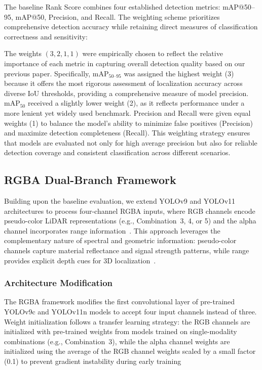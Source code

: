 \documentclass[runningheads]{llncs}
\begin{document}
The baseline Rank Score combines four established detection metrics: mAP@50--95, mAP@50, Precision, and Recall. The weighting scheme prioritizes comprehensive detection accuracy while retaining direct measures of classification correctness and sensitivity:

The weights \((3, 2, 1, 1)\) were empirically chosen to reflect the relative importance of each metric in capturing overall detection quality based on our previous paper. Specifically, \(\text{mAP}_{50\text{--}95}\) was assigned the highest weight (3) because it offers the most rigorous assessment of localization accuracy across diverse IoU thresholds, providing a comprehensive measure of model precision. \(\text{mAP}_{50}\) received a slightly lower weight (2), as it reflects performance under a more lenient yet widely used benchmark. Precision and Recall were given equal weights (1) to balance the model’s ability to minimize false positives (Precision) and maximize detection completeness (Recall). This weighting strategy ensures that models are evaluated not only for high average precision but also for reliable detection coverage and consistent classification across different scenarios.


\subsection{RGBA Dual-Branch Framework}
\label{sec:rgba_framework}

Building upon the baseline evaluation, we extend YOLOv9 and YOLOv11 architectures to process four-channel RGBA inputs, where RGB channels encode pseudo-color LiDAR representations (e.g., Combination~3, 4, or 5) and the alpha channel incorporates range information~\cite{wang2024yolov9,jocher2023ultralytics}. This approach leverages the complementary nature of spectral and geometric information: pseudo-color channels capture material reflectance and signal strength patterns, while range provides explicit depth cues for 3D localization~\cite{vierhub2022study}.

\subsubsection{Architecture Modification}

The RGBA framework modifies the first convolutional layer of pre-trained YOLOv9c and YOLOv11n models to accept four input channels instead of three. Weight initialization follows a transfer learning strategy: the RGB channels are initialized with pre-trained weights from models trained on single-modality combinations (e.g., Combination~3), while the alpha channel weights are initialized using the average of the RGB channel weights scaled by a small factor (0.1) to prevent gradient instability during early training
\end{document}
